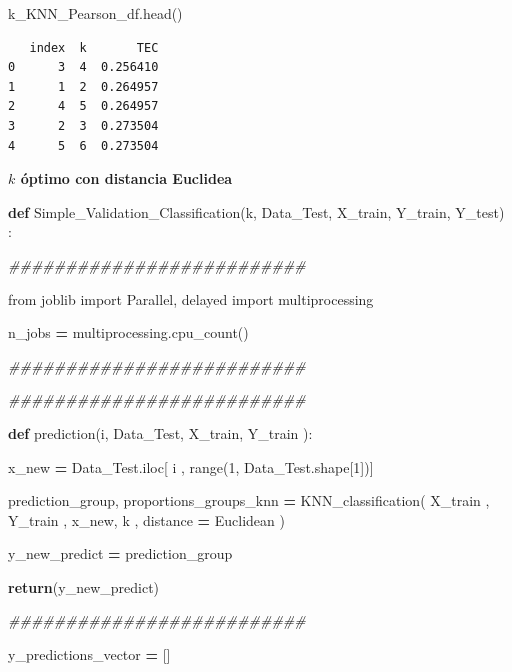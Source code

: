 \documentclass[
  11pt,
  a4paper,
]{article}
\newenvironment{Shaded}{\begin{snugshade}}{\end{snugshade}}
\newcommand{\BuiltInTok}[1]{#1}
\newcommand{\CommentTok}[1]{\textcolor[rgb]{0.56,0.35,0.01}{\textit{#1}}}
\newcommand{\ControlFlowTok}[1]{\textcolor[rgb]{0.13,0.29,0.53}{\textbf{#1}}}
\newcommand{\DecValTok}[1]{\textcolor[rgb]{0.00,0.00,0.81}{#1}}
\newcommand{\ImportTok}[1]{#1}
\newcommand{\KeywordTok}[1]{\textcolor[rgb]{0.13,0.29,0.53}{\textbf{#1}}}
\newcommand{\NormalTok}[1]{#1}
\newcommand{\OperatorTok}[1]{\textcolor[rgb]{0.81,0.36,0.00}{\textbf{#1}}}
\newcommand{\StringTok}[1]{\textcolor[rgb]{0.31,0.60,0.02}{#1}}
\begin{document}
\begin{Shaded}
\begin{Highlighting}[]
\NormalTok{k\_KNN\_Pearson\_df.head()}
\end{Highlighting}
\end{Shaded}

\begin{verbatim}
   index  k       TEC
0      3  4  0.256410
1      1  2  0.264957
2      4  5  0.264957
3      2  3  0.273504
4      5  6  0.273504
\end{verbatim}

\newpage

\textbf{\(k\) óptimo con distancia Euclidea}

\begin{Shaded}
\begin{Highlighting}[]
\KeywordTok{def}\NormalTok{ Simple\_Validation\_Classification(k, Data\_Test, X\_train, Y\_train, Y\_test) :}

    \CommentTok{\#\#\#\#\#\#\#\#\#\#\#\#\#\#\#\#\#\#\#\#\#\#\#\#\#\#}

    \ImportTok{from}\NormalTok{ joblib }\ImportTok{import}\NormalTok{ Parallel, delayed}
    \ImportTok{import}\NormalTok{ multiprocessing}

\NormalTok{    n\_jobs  }\OperatorTok{=}\NormalTok{ multiprocessing.cpu\_count()}

    \CommentTok{\#\#\#\#\#\#\#\#\#\#\#\#\#\#\#\#\#\#\#\#\#\#\#\#\#\#}

    \CommentTok{\#\#\#\#\#\#\#\#\#\#\#\#\#\#\#\#\#\#\#\#\#\#\#\#\#\#}

    \KeywordTok{def}\NormalTok{ prediction(i, Data\_Test, X\_train, Y\_train ):}

\NormalTok{     x\_new }\OperatorTok{=}\NormalTok{ Data\_Test.iloc[ i , }\BuiltInTok{range}\NormalTok{(}\DecValTok{1}\NormalTok{, Data\_Test.shape[}\DecValTok{1}\NormalTok{])]}

\NormalTok{     prediction\_group, proportions\_groups\_knn  }\OperatorTok{=}\NormalTok{  KNN\_classification( X\_train , Y\_train , x\_new, k , distance }\OperatorTok{=} \StringTok{\textquotesingle{}Euclidean\textquotesingle{}}\NormalTok{ )}
     
\NormalTok{     y\_new\_predict }\OperatorTok{=}\NormalTok{ prediction\_group}

     \ControlFlowTok{return}\NormalTok{(y\_new\_predict)}

    \CommentTok{\#\#\#\#\#\#\#\#\#\#\#\#\#\#\#\#\#\#\#\#\#\#\#\#\#\#}

\NormalTok{    y\_predictions\_vector }\OperatorTok{=}\NormalTok{ []}


\end{Highlighting}
\end{Shaded}
\end{document}
